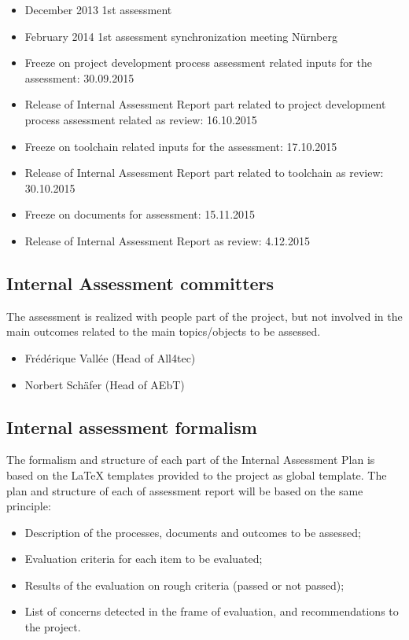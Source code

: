 \documentclass[openetcs]{template/openetcs_article}
\begin{document}
\begin{itemize}
\item December 2013 1st assessment
\item February 2014 1st assessment synchronization meeting N\"urnberg
\item Freeze on project development process assessment related inputs for the assessment: 30.09.2015
\item Release of Internal Assessment Report part related to project development process assessment related as review: 16.10.2015
\item Freeze on toolchain related inputs for the assessment: 17.10.2015
\item Release of Internal Assessment Report part related to toolchain as review: 30.10.2015
\item Freeze on documents for assessment: 15.11.2015
\item Release of Internal Assessment Report as review: 4.12.2015
\end{itemize}

\subsection{Internal Assessment committers}
The assessment is realized with people part of the project, but not involved in the main outcomes related to the main topics/objects to be assessed.
\begin{itemize}
\item Fr\'ed\'erique Vall\'ee (Head of All4tec)
\item Norbert Sch\"afer (Head of AEbT)
\end{itemize}

\subsection{Internal assessment formalism}
The formalism and structure of each part of the Internal Assessment Plan is based on the LaTeX templates provided to the project as global template.
The plan and structure of each of assessment report will be based on the same principle:
 \begin{itemize}
\item Description of the processes, documents and outcomes to be assessed;
\item Evaluation criteria for each item to be evaluated;
\item Results of the evaluation on rough criteria (passed or not passed);
\item List of concerns detected in the frame of evaluation, and recommendations to the project.
\end{itemize}







\end{document}

